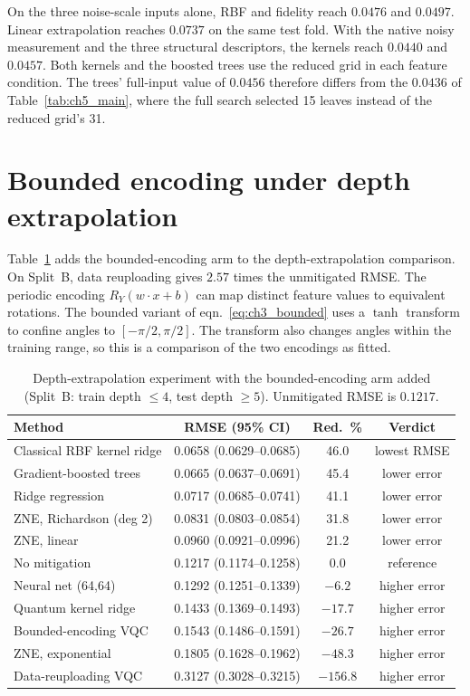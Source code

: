 \documentclass[Thesis.tex]{subfiles}
\begin{document}
On the three noise-scale inputs alone, RBF and fidelity reach
$0.0476$ and
$0.0497$. Linear extrapolation
reaches $0.0737$ on the same test fold. With the native noisy measurement
and the three structural descriptors, the kernels reach
$0.0440$ and
$0.0457$.
Both kernels and the boosted trees use the reduced grid in each feature condition.
The trees' full-input value of $0.0456$ therefore differs from the $0.0436$ of
Table~\ref{tab:ch5_main}, where the full search selected 15 leaves instead of the
reduced grid's 31.

\section{Bounded encoding under depth extrapolation}
\label{sec:ch5_bounded}

Table~\ref{tab:ch5_bounded} adds the bounded-encoding arm to the depth-extrapolation
comparison. On Split~B, data reuploading gives $2.57$ times the unmitigated RMSE.
The periodic encoding $R_Y(w \cdot x + b)$ can map distinct feature values to
equivalent rotations. The bounded variant of eqn.~\eqref{eq:ch3_bounded} uses
a $\tanh$ transform to confine angles to $[-\pi/2, \pi/2]$. The transform also
changes angles within the training range, so this is a comparison of the two
encodings as fitted.

\begin{table}[htbp]
\centering
\caption[Depth extrapolation with the bounded-encoding arm]{Depth-extrapolation experiment with the bounded-encoding arm added
(Split~B: train depth $\leq 4$, test depth $\geq 5$). Unmitigated RMSE is $0.1217$.}
\label{tab:ch5_bounded}
\small
\begin{tabular}{lccc}
\toprule
\textbf{Method} & \textbf{RMSE (95\% CI)} & \textbf{Red.\ \%} & \textbf{Verdict} \\
\midrule
Classical RBF kernel ridge & 0.0658 (0.0629--0.0685) & 46.0 & lowest RMSE \\
Gradient-boosted trees & 0.0665 (0.0637--0.0691) & 45.4 & lower error \\
Ridge regression & 0.0717 (0.0685--0.0741) & 41.1 & lower error \\
ZNE, Richardson (deg 2) & 0.0831 (0.0803--0.0854) & 31.8 & lower error \\
ZNE, linear & 0.0960 (0.0921--0.0996) & 21.2 & lower error \\
No mitigation & 0.1217 (0.1174--0.1258) & 0.0 & reference \\
Neural net (64,64) & 0.1292 (0.1251--0.1339) & $-6.2$ & higher error \\
Quantum kernel ridge & 0.1433 (0.1369--0.1493) & $-17.7$ & higher error \\
Bounded-encoding VQC & 0.1543 (0.1486--0.1591) & $-26.7$ & higher error \\
ZNE, exponential & 0.1805 (0.1628--0.1962) & $-48.3$ & higher error \\
Data-reuploading VQC & 0.3127 (0.3028--0.3215) & $-156.8$ & higher error \\
\bottomrule
\end{tabular}
\end{table}
\end{document}
